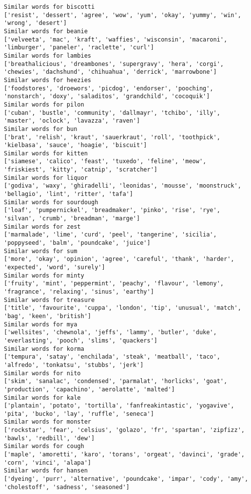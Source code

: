 \documentclass[11pt]{article}
\begin{document}
\begin{Verbatim}[commandchars=\\\{\}]
Similar words for biscotti
['resist', 'dessert', 'agree', 'wow', 'yum', 'okay', 'yummy', 'win', 'wrong', 'desert']
Similar words for beanie
['velveeta', 'mac', 'kraft', 'waffies', 'wisconsin', 'macaroni', 'limburger', 'paneler', 'raclette', 'curl']
Similar words for lambies
['breathalicious', 'dreambones', 'supergravy', 'hera', 'corgi', 'chewies', 'dachshund', 'chihuahua', 'derrick', 'marrowbone']
Similar words for heezies
['foodstores', 'droewors', 'picdog', 'endorser', 'pooching', 'nonstarch', 'doxy', 'saladitos', 'grandchild', 'cocoquik']
Similar words for pilon
['cuban', 'bustle', 'community', 'dallmayr', 'tchibo', 'illy', 'master', 'oclock', 'lavazza', 'raven']
Similar words for bun
['brat', 'relish', 'kraut', 'sauerkraut', 'roll', 'toothpick', 'kielbasa', 'sauce', 'hoagie', 'biscuit']
Similar words for kitten
['siamese', 'calico', 'feast', 'tuxedo', 'feline', 'meow', 'friskiest', 'kitty', 'catnip', 'scratcher']
Similar words for liquor
['godiva', 'waxy', 'ghiradelli', 'leonidas', 'mousse', 'moonstruck', 'bellagio', 'lint', 'ritter', 'tafa']
Similar words for sourdough
['loaf', 'pumpernickel', 'breadmaker', 'pinko', 'rise', 'rye', 'silvan', 'crumb', 'breadman', 'marge']
Similar words for zest
['marmalade', 'lime', 'curd', 'peel', 'tangerine', 'sicilia', 'poppyseed', 'balm', 'poundcake', 'juice']
Similar words for sum
['more', 'okay', 'opinion', 'agree', 'careful', 'thank', 'harder', 'expected', 'word', 'surely']
Similar words for minty
['fruity', 'mint', 'peppermint', 'peachy', 'flavour', 'lemony', 'fragrance', 'relaxing', 'sinus', 'earthy']
Similar words for treasure
['title', 'favourite', 'cuppa', 'london', 'tip', 'unusual', 'match', 'bag', 'keen', 'british']
Similar words for mya
['wellsites', 'chewnola', 'jeffs', 'lammy', 'butler', 'duke', 'everlasting', 'pooch', 'slims', 'quackers']
Similar words for korma
['tempura', 'satay', 'enchilada', 'steak', 'meatball', 'taco', 'alfredo', 'tonkatsu', 'stubbs', 'jerk']
Similar words for nito
['skim', 'sanalac', 'condensed', 'parmalat', 'horlicks', 'goat', 'production', 'capachino', 'aerolatte', 'malted']
Similar words for kale
['plantain', 'potato', 'tortilla', 'fanfreakintastic', 'yogavive', 'pita', 'bucko', 'lay', 'ruffle', 'seneca']
Similar words for monster
['rockstar', 'fear', 'celsius', 'golazo', 'fr', 'spartan', 'zipfizz', 'bawls', 'redbill', 'dew']
Similar words for cough
['maple', 'amoretti', 'karo', 'torans', 'orgeat', 'davinci', 'grade', 'corn', 'vinci', 'alapa']
Similar words for hansen
['dyeing', 'purr', 'alternative', 'poundcake', 'impar', 'cody', 'amy', 'cholestoff', 'sadness', 'seasoned']

\end{Verbatim}
\end{document}
